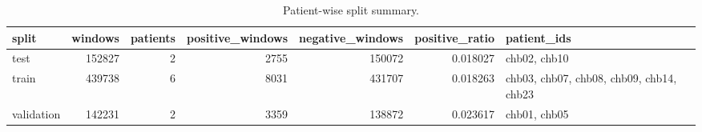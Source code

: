 \begin{table}
\caption{Patient-wise split summary.}
\label{tab:patient_split_table}
\begin{tabular}{lrrrrrl}
\toprule
split & windows & patients & positive\_windows & negative\_windows & positive\_ratio & patient\_ids \\
\midrule
test & 152827 & 2 & 2755 & 150072 & 0.018027 & chb02, chb10 \\
train & 439738 & 6 & 8031 & 431707 & 0.018263 & chb03, chb07, chb08, chb09, chb14, chb23 \\
validation & 142231 & 2 & 3359 & 138872 & 0.023617 & chb01, chb05 \\
\bottomrule
\end{tabular}
\end{table}
